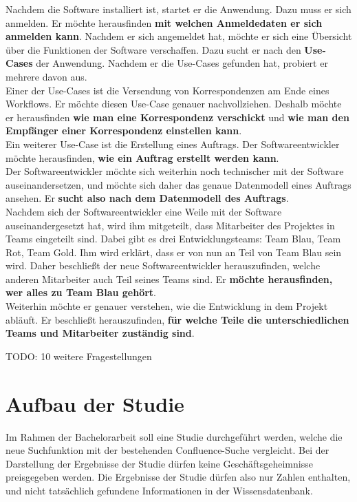 Nachdem die Software installiert ist, startet er die Anwendung.
Dazu muss er sich anmelden.
Er möchte herausfinden \textbf{mit welchen Anmeldedaten er sich anmelden kann}.
Nachdem er sich angemeldet hat, möchte er sich eine Übersicht über die Funktionen der Software verschaffen.
Dazu sucht er nach den \textbf{Use-Cases} der Anwendung.
Nachdem er die Use-Cases gefunden hat, probiert er mehrere davon aus.\\

Einer der Use-Cases ist die Versendung von Korrespondenzen am Ende eines Workflows.
Er möchte diesen Use-Case genauer nachvollziehen.
Deshalb möchte er herausfinden \textbf{wie man eine Korrespondenz verschickt} und \textbf{wie man den Empfänger einer Korrespondenz einstellen kann}.\\

Ein weiterer Use-Case ist die Erstellung eines Auftrags.
Der Softwareentwickler möchte herausfinden, \textbf{wie ein Auftrag erstellt werden kann}.\\

Der Softwareentwickler möchte sich weiterhin noch technischer mit der Software auseinandersetzen, und möchte sich daher das genaue Datenmodell eines Auftrags ansehen.
Er \textbf{sucht also nach dem Datenmodell des Auftrags}.\\

Nachdem sich der Softwareentwickler eine Weile mit der Software auseinandergesetzt hat, wird ihm mitgeteilt, dass Mitarbeiter des Projektes in Teams eingeteilt sind.
Dabei gibt es drei Entwicklungsteams: Team Blau, Team Rot, Team Gold.
Ihm wird erklärt, dass er von nun an Teil von Team Blau sein wird.
Daher beschließt der neue Softwareentwickler herauszufinden, welche anderen Mitarbeiter auch Teil seines Teams sind.
Er \textbf{möchte herausfinden, wer alles zu Team Blau gehört}.\\

Weiterhin möchte er genauer verstehen, wie die Entwicklung in dem Projekt abläuft.
Er beschließt herauszufinden, \textbf{für welche Teile die unterschiedlichen Teams und Mitarbeiter zuständig sind}.

TODO: 10 weitere Fragestellungen

\section{Aufbau der Studie}
Im Rahmen der Bachelorarbeit soll eine Studie durchgeführt werden, welche die neue Suchfunktion mit der bestehenden Confluence-Suche vergleicht.
Bei der Darstellung der Ergebnisse der Studie dürfen keine Geschäftsgeheimnisse preisgegeben werden.
Die Ergebnisse der Studie dürfen also nur Zahlen enthalten, und nicht tatsächlich gefundene Informationen in der Wissensdatenbank.\\

